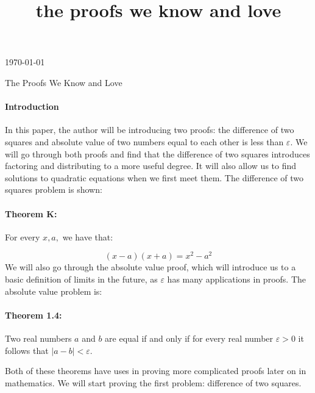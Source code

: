 \documentclass[a4paper, 12pt]{article}
\title{the proofs we know and love}
\begin{document}
\today
\begin{center}
The Proofs We Know and Love 
\end{center}
\paragraph{Introduction}
In this paper, the author will be introducing two proofs: the difference of two squares and absolute value of two numbers equal to each other is less than \(\varepsilon \). We will go through both proofs and find that the difference of two squares introduces factoring and distributing to a more useful degree. It will also allow us to find solutions to quadratic equations when we first meet them. The difference of two squares problem is shown:

\paragraph{Theorem K:} 
For every \(x,a,\) we have that:

\[(x-a)(x+a) = {x}^{2} - {a}^{2} \]
We will also go through the absolute value proof, which will introduce us to a basic definition of limits in the future, as \(\varepsilon \) has many applications in proofs. The absolute value problem is:
\paragraph{Theorem 1.4:}
Two real numbers \(a\) and \(b\) are equal if and only if for every real number \(\varepsilon  > 0 \) it follows that \(\left| a-b \right| < \varepsilon  \). \newline

Both of these theorems have uses in proving more complicated proofs later on in mathematics. We will start proving the first problem: difference of two squares.
\end{document}

